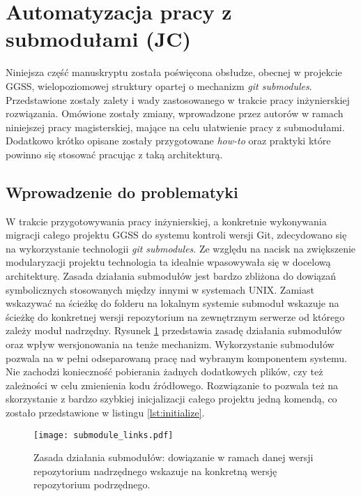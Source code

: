 \clearpage
\section{Automatyzacja pracy z submodułami (JC)}
\label{sec:gitio}

Niniejsza część manuskryptu została poświęcona obsłudze, obecnej w projekcie GGSS, wielopoziomowej struktury  opartej o mechanizm \emph{git submodules}. Przedstawione zostały zalety i wady zastosowanego w trakcie pracy inżynierskiej rozwiązania. Omówione zostały zmiany, wprowadzone przez autorów w ramach niniejszej pracy magisterskiej, mające na celu ułatwienie pracy z submodułami. Dodatkowo krótko opisane zostały przygotowane \emph{how-to} oraz praktyki które powinno się stosować pracując z taką architekturą.

\subsection{Wprowadzenie do problematyki}
W trakcie przygotowywania pracy inżynierskiej, a konkretnie wykonywania migracji całego projektu GGSS do systemu kontroli wersji Git, zdecydowano się na wykorzystanie technologii \emph{git submodules}. Ze względu na nacisk na zwiększenie modularyzacji projektu technologia ta idealnie wpasowywała się w docelową architekturę. Zasada działania submodułów jest bardzo zbliżona do dowiązań symbolicznych stosowanych między innymi w systemach UNIX. Zamiast wskazywać na ścieżkę do folderu na lokalnym systemie submoduł wskazuje na ścieżkę do konkretnej wersji repozytorium na zewnętrznym serwerze od którego zależy moduł nadrzędny. Rysunek \ref{fig:submodules_links} przedstawia zasadę działania submodułów oraz wpływ wersjonowania na tenże mechanizm. Wykorzystanie submodułów pozwala na w pełni odseparowaną pracę nad wybranym komponentem systemu. Nie zachodzi konieczność pobierania żadnych dodatkowych plików, czy też zależności w celu zmienienia kodu źródłowego. Rozwiązanie to pozwala też na skorzystanie z bardzo szybkiej inicjalizacji całego projektu jedną komendą, co zostało przedstawione w listingu \ref{lst:initialize}.

\begin{figure}[H]
    \centering
    \texttt{[image: submodule\_links.pdf]}
    \caption{Zasada działania submodułów: dowiązanie w ramach danej wersji repozytorium nadrzędnego wskazuje na konkretną wersję repozytorium podrzędnego.}
    \label{fig:submodules_links}
\end{figure}

